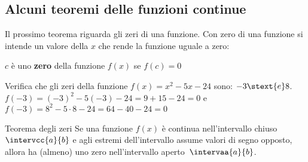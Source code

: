 % 
% 
% 

\subsection{Alcuni teoremi delle funzioni continue}
\label{subsec:cont_iperinteri}

Il prossimo teorema riguarda gli zeri di una funzione. Con zero di una 
funzione 
si intende un valore della \(x\) che rende la funzione uguale a zero:

\begin{newdef}{}{}
 \(c\) è uno \textbf{zero} della funzione \(f(x)\) se \(f(c)=0\)
\end{newdef}

\begin{esempio}
Verifica che gli zeri della funzione \(f(x) = x^2 -5x -24\) \quad sono: 
\(-3 \stext{e} 8\).\\ [.5em]
\(f(-3) = (-3)^2 -5 (-3) -24 = 9 +15 -24 = 0\) \quad e \quad 
\(f(-3) = 8^2 -5 \cdot 8 -24 = 64 -40 -24 = 0\)
\end{esempio}


\begin{newtheo}{Teorema degli zeri}{}
Se una funzione \(f(x)\) è continua nell'intervallo chiuso
\(\intervcc{a}{b}\) e agli estremi dell'intervallo assume valori di segno 
opposto, allora ha (almeno) uno zero nell'intervallo 
aperto~\(\intervaa{a}{b}\).
\end{newtheo}

